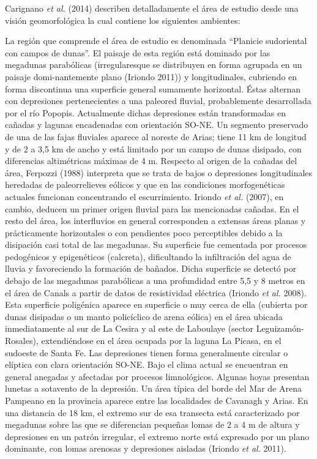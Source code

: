 \documentclass[10pt,a4paper, twoside]{report}
\begin{document}
Carignano \textit{et al.} (2014) describen detalladamente el área de estudio desde una visión geomorfológica la cual contiene los siguientes ambientes:

La región que comprende el área de estudio es denominada "`Planicie sudoriental con campos de dunas"'. El paisaje de esta región está dominado por las megadunas parabólicas (irregularesque se distribuyen en forma agrupada en un paisaje domi-nantemente plano (Iriondo 2011)) y longitudinales, cubriendo en forma discontinua una superficie general sumamente horizontal. Éstas alternan con depresiones  pertenecientes a una paleored fluvial, probablemente desarrollada por el río Popopis. Actualmente dichas depresiones están transformadas en cañadas y lagunas encadenadas con orientación SO-NE. Un segmento preservado de una de las fajas fluviales aparece al noreste de Arias; tiene 11 km de longitud y de 2 a 3,5 km de ancho y está limitado por un campo de dunas disipado, con diferencias altimétricas máximas de 4 m. Respecto al origen de la cañadas del área, Ferpozzi (1988) interpreta que se trata de bajos o depresiones longitudinales heredadas de paleorrelieves eólicos y que en las condiciones morfogenéticas actuales funcionan concentrando el escurrimiento. Iriondo \textit{et al.} (2007), en cambio, deducen un primer origen fluvial para las mencionadas cañadas.
En el resto del área, los interfluvios en general corresponden a extensas áreas planas y prácticamente horizontales o con pendientes poco perceptibles debido a la disipación casi total de las megadunas. Su superficie fue cementada por procesos pedogénicos y epigenéticos (calcreta), dificultando la infiltración del agua de lluvia y favoreciendo la formación de bañados. Dicha superficie se detectó por debajo de las megadunas parabólicas a una profundidad entre 5,5 y 8 metros en el área de Canals a partir de datos de resistividad eléctrica (Iriondo \textit{et al.} 2008). Esta superficie poligénica aparece en superficie o muy cerca de ella (cubierta por dunas disipadas o un manto policíclico de arena eólica) en el área ubicada inmediatamente al sur de La Cesira y al este de Laboulaye (sector Leguizamón-Rosales), extendiéndose en el área ocupada por la laguna La Picasa, en el sudoeste de Santa Fe. Las depresiones tienen forma generalmente circular o elíptica con clara orientación SO-NE. Bajo el clima actual se encuentran en general anegadas y afectadas por procesos limnológicos. Algunas hoyas presentan lunetas a sotavento de la depresión. Un área típica del borde del Mar de Arena Pampeano en la provincia aparece entre las localidades de Cavanagh y Arias. En una distancia de 18 km, el extremo sur de esa transecta está caracterizado por megadunas sobre las que se diferencian pequeñas lomas de 2 a 4 m de altura y depresiones en un patrón irregular, el extremo norte está expresado por un plano dominante, con lomas arenosas y depresiones aisladas (Iriondo \textit{et al.} 2011).
\end{document}
